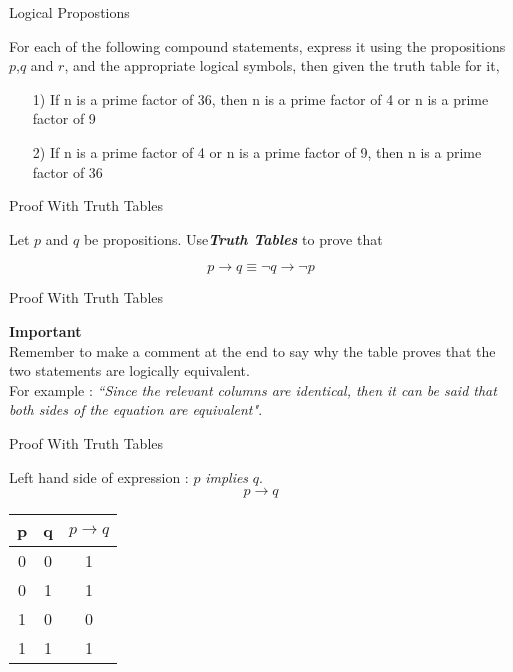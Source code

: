 

{Logical Propostions}

For each of the following compound statements, express it using the propositions $p$,$q$ and $r$, and the appropriate logical symbols, then given the truth table for it,

\begin{itemize}
\item[1)] If n is a prime factor of 36, then n is a prime factor of 4 or n is a prime factor of 9
\item[2)] If n is a prime factor of 4 or n is a prime factor of 9, then  n is a prime factor of 36
\end{itemize}





{Proof With Truth Tables}

Let $p$ and $q$ be propositions. Use\textbf{\textit{Truth Tables}} to prove that

\[ p \rightarrow q \equiv \neg q \rightarrow \neg p\]


{Proof With Truth Tables}

\textbf{Important}\\ 
Remember to make a comment at the end to say why the table proves that the two statements are logically equivalent. \\ For example : \emph{``Since the relevant columns are identical, then it can be said that both sides of the equation are equivalent"}.


{Proof With Truth Tables}

Left hand side of expression : $p$ \textit{implies} $q$.
\[p \rightarrow q\]
\begin{center}
\begin{tabular}{|c|c||c|}
\hline  \phantom{spa}p\phantom{spa}&  \phantom{spa}q\phantom{spa}& \phantom{sp}$p \rightarrow q$ \phantom{sp} \\ 
\hline  0&  0&  1\\ 
\hline  0&  1&  1\\ 
\hline  1&  0&  0\\ 
\hline  1&  1&  1\\ 
\hline 
\end{tabular} 
\end{center}



